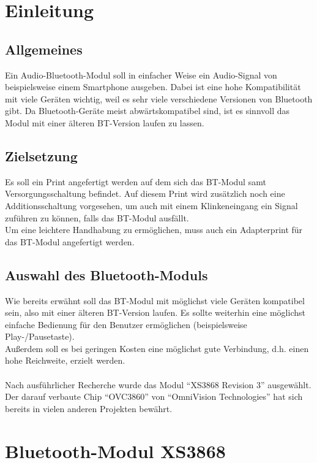 \chapter{Einleitung}
\section{Allgemeines}
Ein Audio-Bluetooth-Modul soll in einfacher Weise ein Audio-Signal von beispielsweise einem Smartphone ausgeben. Dabei ist eine hohe Kompatibilität mit viele Geräten wichtig, weil es sehr viele verschiedene Versionen von Bluetooth gibt. Da Bluetooth-Geräte meist abwärtskompatibel sind, ist es sinnvoll das Modul mit einer älteren BT-Version laufen zu lassen.

\section{Zielsetzung}
Es soll ein Print angefertigt werden auf dem sich das BT-Modul samt Versorgungsschaltung befindet. Auf diesem Print wird zusätzlich noch eine Additionsschaltung vorgesehen, um auch mit einem Klinkeneingang ein Signal zuführen zu können, falls das BT-Modul ausfällt.\\
Um eine leichtere Handhabung zu ermöglichen, muss auch ein Adapterprint für das BT-Modul angefertigt werden.

\section{Auswahl des Bluetooth-Moduls}
Wie bereits erwähnt soll das BT-Modul mit möglichst viele Geräten kompatibel sein, also mit einer älteren BT-Version laufen. Es sollte weiterhin eine möglichst einfache Bedienung für den Benutzer ermöglichen (beispielsweise Play-/Pausetaste).\\
Außerdem soll es bei geringen Kosten eine möglichst gute Verbindung, d.h. einen hohe Reichweite, erzielt werden.\\ \\
Nach ausführlicher Recherche wurde das Modul \enquote{XS3868 Revision 3} ausgewählt. Der darauf verbaute Chip \enquote{OVC3860} von \enquote{OmniVision Technologies} hat sich bereits in vielen anderen Projekten bewährt. 

\chapter{Bluetooth-Modul XS3868}
